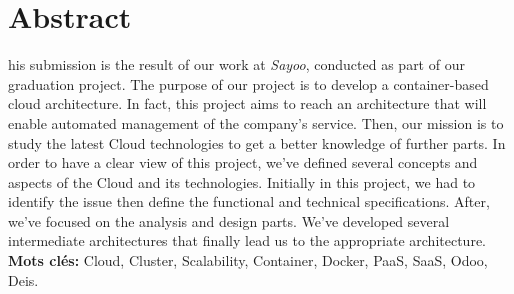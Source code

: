
\chapter*{Abstract}
\begin{singlespace}
his submission is the result of our work at \emph{Sayoo}, conducted as part of our graduation project. The purpose of our project is to develop a container-based cloud architecture. 
\newline
\newline
In fact, this project aims to reach an architecture that will enable automated management of the company's service. Then, our mission is to study the latest Cloud technologies to get a better knowledge of further parts.
\noindent In order to have a clear view of this project, we've defined several concepts and aspects of the Cloud and its technologies.
\newline
\newline
Initially in this project, we had to identify the issue then define the functional and technical specifications. After, we've focused on the analysis and design parts. We've developed several intermediate architectures that finally lead us to the appropriate architecture.
\vfill{\textbf{Mots clés:} Cloud, Cluster, Scalability, Container, Docker, PaaS, SaaS, Odoo, Deis.}
\end{singlespace}